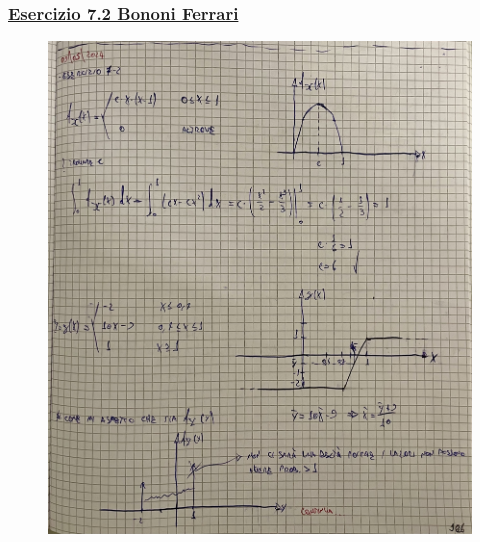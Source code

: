 \documentclass{article}
\begin{document}
\subsubsection{\underline{Esercizio 7.2 Bononi Ferrari}}
\begin{figure}[ht]
\centering
\includegraphics[scale=0.10]{ese/34.jpeg}
\end{figure}
\end{document}
